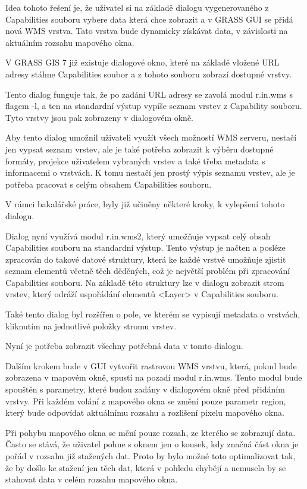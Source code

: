 \documentclass[a4paper,12pt]{article}
\begin{document}
Idea tohoto řešení je, že uživatel si na základě dialogu
vygenerovaného z Capabilities souboru vybere data která chce zobrazit
a v GRASS GUI se přidá nová WMS vrstva. Tato vrstva bude dynamicky
získávat data, v závislosti na aktuálním rozsahu mapového okna.

V GRASS GIS 7 již existuje dialogové okno, které na základě vložené
URL adresy stáhne Capabilities soubor a z tohoto souboru zobrazí
dostupné vrstvy.

Tento dialog funguje tak, že po zadání URL adresy se zavolá modul
r.in.wms s flagem -l, a ten na standardní výstup vypíše seznam vrstev
z Capability souboru. Tyto vrstvy jsou pak zobrazeny v dialogovém
okně.

Aby tento dialog umožnil uživateli využít všech možností WMS serveru,
nestačí jen vypsat seznam vrstev, ale je také potřeba zobrazit k
výběru dostupné formáty, projekce uživatelem vybraných vrstev a také
třeba metadata s informacemi o vrstvách. K tomu nestačí jen prostý
výpis seznamu vrstev, ale je potřeba pracovat s celým obsahem
Capabilities souboru.

V rámci bakalářské práce, byly již učiněny některé kroky, k vylepšení
tohoto dialogu.

Dialog nyní využívá modul r.in.wms2, který umožňuje vypsat celý obsah
Capabilities souboru na standardní výstup. Tento výstup je načten a
posléze zpracován do takové datové struktury, která ke každé vrstvě
umožňuje zjistit seznam elementů včetně těch děděných, což je největší
problém při zpracování Capabilities souboru. Na základě této struktury
lze v dialogu zobrazit strom vrstev, který odráží uspořádání elementů
<Layer> v Capabilities souboru.

Také tento dialog byl rozšířen o pole, ve kterém se vypisují metadata
o vrstvách, kliknutím na jednotlivé položky stromu vrstev.

Nyní je potřeba zobrazit všechny potřebná data v tomto dialogu.

 Dalším krokem bude v GUI vytvořit rastrovou WMS vrstvu, která, pokud
 bude zobrazena v mapovém okně, spustí na pozadí modul r.in.wms. Tento
 modul bude spouštěn s parametry, které budou zadány v dialogovém okně
 před přidáním vrstvy. Při každém volání z mapového okna se změní
 pouze parametr region, který bude odpovídat aktuálnímu rozsahu a
 rozlišení pixelu mapového okna.
 
Při pohybu mapového okna se mění pouze rozsah, ze kterého se zobrazují
data. Často se stává, že uživatel pohne s oknem jen o kousek, kdy
značná část okna je pořád v rozsahu již stažených dat. Proto by bylo
možné toto optimalizovat tak, že by došlo ke stažení jen těch dat,
která v pohledu chybějí a nemusela by se stahovat data v celém rozsahu
mapového okna.
\end{document}
